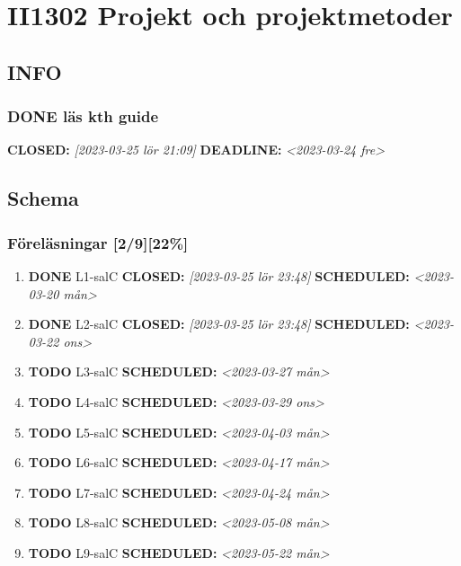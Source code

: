 \documentclass[11pt]{article}
\begin{document}
\section{II1302 Projekt och projektmetoder}
\label{sec:orgcef4b2e}
\subsection{INFO}
\label{sec:org68ede0e}
\subsubsection{{\bfseries\sffamily DONE} läs kth guide}
\label{sec:org22c75f4}
\noindent\textbf{CLOSED:} \textit{[2023-03-25 lör 21:09] } \textbf{DEADLINE:} \textit{<2023-03-24 fre>}\\[0pt]

\subsection{Schema}
\label{sec:org1dc2ce5}
\subsubsection{Föreläsningar [2/9][22\%]}
\label{sec:org87f708d}
\begin{enumerate}
\item {\bfseries\sffamily DONE} L1-salC
\label{sec:orge32ee1f}
\noindent\textbf{CLOSED:} \textit{[2023-03-25 lör 23:48] } \textbf{SCHEDULED:} \textit{<2023-03-20 mån>}\\[0pt]
\item {\bfseries\sffamily DONE} L2-salC
\label{sec:org422902d}
\noindent\textbf{CLOSED:} \textit{[2023-03-25 lör 23:48] } \textbf{SCHEDULED:} \textit{<2023-03-22 ons>}\\[0pt]
\item {\bfseries\sffamily TODO} L3-salC
\label{sec:org0cf91c3}
\noindent\textbf{SCHEDULED:} \textit{<2023-03-27 mån>}\\[0pt]
\item {\bfseries\sffamily TODO} L4-salC
\label{sec:org41f1827}
\noindent\textbf{SCHEDULED:} \textit{<2023-03-29 ons>}\\[0pt]
\item {\bfseries\sffamily TODO} L5-salC
\label{sec:org419bc10}
\noindent\textbf{SCHEDULED:} \textit{<2023-04-03 mån>}\\[0pt]
\item {\bfseries\sffamily TODO} L6-salC
\label{sec:org48c213a}
\noindent\textbf{SCHEDULED:} \textit{<2023-04-17 mån>}\\[0pt]
\item {\bfseries\sffamily TODO} L7-salC
\label{sec:org452fe50}
\noindent\textbf{SCHEDULED:} \textit{<2023-04-24 mån>}\\[0pt]
\item {\bfseries\sffamily TODO} L8-salC
\label{sec:orgb97ee8f}
\noindent\textbf{SCHEDULED:} \textit{<2023-05-08 mån>}\\[0pt]
\item {\bfseries\sffamily TODO} L9-salC
\label{sec:orga92b640}
\noindent\textbf{SCHEDULED:} \textit{<2023-05-22 mån>}\\[0pt]
\end{enumerate}
\end{document}
